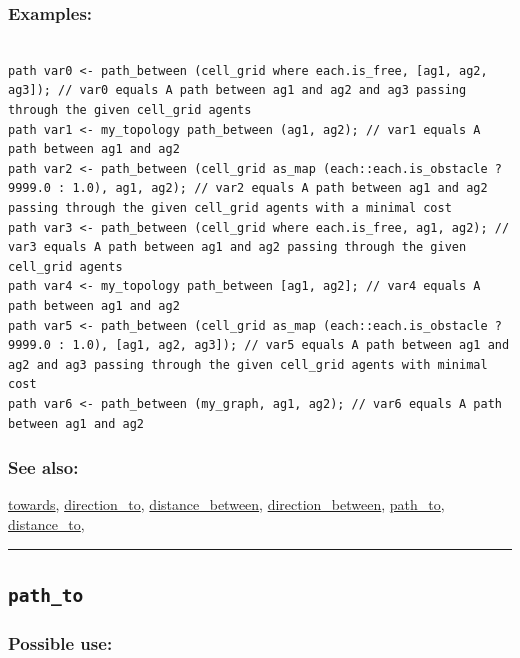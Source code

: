 \documentclass[]{book}
\theoremstyle{definition}
\theoremstyle{definition}
\theoremstyle{definition}
\theoremstyle{remark}
\begin{document}
\subsubsection{Examples:}\label{examples-271}

\begin{verbatim}
 
path var0 <- path_between (cell_grid where each.is_free, [ag1, ag2, ag3]); // var0 equals A path between ag1 and ag2 and ag3 passing through the given cell_grid agents 
path var1 <- my_topology path_between (ag1, ag2); // var1 equals A path between ag1 and ag2 
path var2 <- path_between (cell_grid as_map (each::each.is_obstacle ? 9999.0 : 1.0), ag1, ag2); // var2 equals A path between ag1 and ag2 passing through the given cell_grid agents with a minimal cost 
path var3 <- path_between (cell_grid where each.is_free, ag1, ag2); // var3 equals A path between ag1 and ag2 passing through the given cell_grid agents 
path var4 <- my_topology path_between [ag1, ag2]; // var4 equals A path between ag1 and ag2 
path var5 <- path_between (cell_grid as_map (each::each.is_obstacle ? 9999.0 : 1.0), [ag1, ag2, ag3]); // var5 equals A path between ag1 and ag2 and ag3 passing through the given cell_grid agents with minimal cost 
path var6 <- path_between (my_graph, ag1, ag2); // var6 equals A path between ag1 and ag2
\end{verbatim}

\subsubsection{See also:}\label{see-also-159}

\href{operators-s-to-z.html\#towards}{towards},
\href{operators-d-to-h.html\#direction_to}{direction\_to},
\href{operators-d-to-h.html\#distance_between}{distance\_between},
\href{operators-d-to-h.html\#direction_between}{direction\_between},
\href{operators-n-to-r.html\#path_to}{path\_to},
\href{operators-d-to-h.html\#distance_to}{distance\_to},

\begin{center}\rule{0.5\linewidth}{\linethickness}\end{center}

\subsection{\texorpdfstring{\texttt{path\_to}}{path\_to}}\label{path_to}

\subsubsection{Possible use:}\label{possible-use-396}
\end{document}
